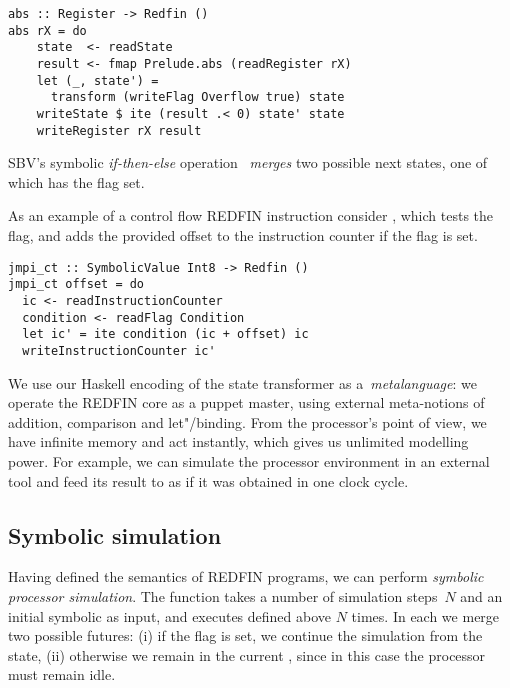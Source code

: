 \begin{verbatim}
abs :: Register -> Redfin ()
abs rX = do
    state  <- readState
    result <- fmap Prelude.abs (readRegister rX)
    let (_, state') =
      transform (writeFlag Overflow true) state
    writeState $ ite (result .< 0) state' state
    writeRegister rX result
\end{verbatim}

\noindent
SBV's symbolic \emph{if-then-else} operation~ \emph{merges} two possible
next states, one of which has the  flag set.


As an example of a control flow REDFIN instruction consider , which
tests the~ flag, and adds the provided offset to the instruction
counter if the flag is set.

\begin{verbatim}
jmpi_ct :: SymbolicValue Int8 -> Redfin ()
jmpi_ct offset = do
  ic <- readInstructionCounter
  condition <- readFlag Condition
  let ic' = ite condition (ic + offset) ic
  writeInstructionCounter ic'
\end{verbatim}

\noindent
We use our Haskell encoding of the state transformer as a~\emph{metalanguage}:
we operate the REDFIN core as a puppet master, using external meta-notions of
addition, comparison and let"/binding. From the processor's
point of view, we have infinite memory and act instantly, which gives us unlimited
modelling power. For example, we can simulate the processor environment
in an external tool and feed its result to  as if it was
obtained in one clock cycle.

\subsection{Symbolic simulation}

Having defined the semantics of REDFIN programs, we can perform \emph{symbolic
processor simulation}. The function  takes a number of simulation
steps~$N$ and an initial symbolic  as input, and executes
 defined above $N$ times. In each  we
merge two possible futures: (i) if the  flag is set, we continue the
simulation from the  state, (ii) otherwise we remain in the current
, since in this case the processor must remain idle.

